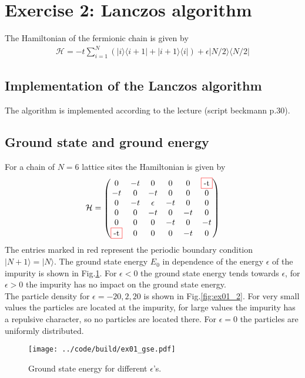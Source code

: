 \section{Exercise 2: Lanczos algorithm}
The Hamiltonian of the fermionic chain is given by
\begin{align}
    \mathcal{H} = - t \sum^N_{i=1} \left( | i \rangle \langle i+1| + | i+ 1\rangle \langle i |  \right) +  \epsilon | N/2 \rangle \langle N/2|
\end{align}

\subsection{Implementation of the Lanczos algorithm}
The algorithm is implemented according to the lecture (script beckmann p.30).

\subsection{Ground state and ground energy}
For a chain of $N=6$ lattice sites the Hamiltonian is given by
\begin{align}
    \mathcal{H} = 
    \begin{pmatrix}
        0&-t&0&0&0& \fcolorbox{red}{white}{-t} \\
        -t&0&-t&0&0&0 \\
        0&-t&\epsilon&-t&0&0 \\
        0&0&-t&0&-t&0 \\
        0&0&0&-t&0&-t \\
        \fcolorbox{red}{white}{-t}&0&0&0&-t&0 
    \end{pmatrix}
\end{align}
The entries marked in red represent the periodic boundary condition $| N+1 \rangle = | N\rangle$. The ground state energy $E_0$ in dependence of the energy $\epsilon$ of the impurity is shown in Fig.\ref{fig:ex01_1}. For $\epsilon < 0$ the ground state energy tends towards $\epsilon$, for $\epsilon > 0$ the impurity has no impact on the ground state energy.\\
The particle density for $\epsilon = -20,2,20$ is shown in Fig.\ref{fig:ex01_2}. For very small values the particles are located at the impurity, for large values the impurity has a repulsive character, so no particles are located there. For $\epsilon = 0$ the particles are uniformly distributed.

\begin{figure}[h]
    \centering
    \texttt{[image: ../code/build/ex01\_gse.pdf]}
    \caption{Ground state energy for different $\epsilon$'s. }
    \label{fig:ex01_1}
\end{figure}

